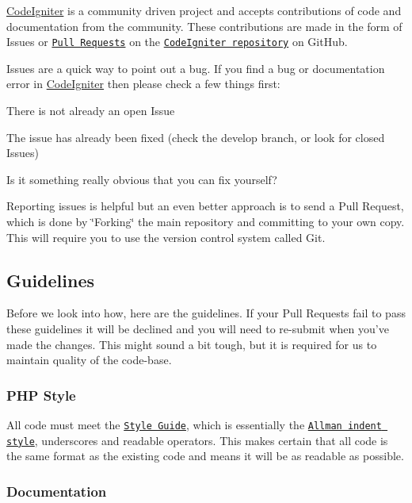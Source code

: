 \hyperlink{namespace_code_igniter}{Code\+Igniter} is a community driven project and accepts contributions of code and documentation from the community. These contributions are made in the form of Issues or \href{http://help.github.com/send-pull-requests/}{\tt Pull Requests} on the \href{https://github.com/bcit-ci/CodeIgniter}{\tt Code\+Igniter repository} on Git\+Hub.

Issues are a quick way to point out a bug. If you find a bug or documentation error in \hyperlink{namespace_code_igniter}{Code\+Igniter} then please check a few things first\+:


\begin{DoxyEnumerate}
\item There is not already an open Issue
\item The issue has already been fixed (check the develop branch, or look for closed Issues)
\item Is it something really obvious that you can fix yourself?
\end{DoxyEnumerate}

Reporting issues is helpful but an even better approach is to send a Pull Request, which is done by \char`\"{}\+Forking\char`\"{} the main repository and committing to your own copy. This will require you to use the version control system called Git.

\subsection*{Guidelines}

Before we look into how, here are the guidelines. If your Pull Requests fail to pass these guidelines it will be declined and you will need to re-\/submit when you’ve made the changes. This might sound a bit tough, but it is required for us to maintain quality of the code-\/base.

\subsubsection*{P\+H\+P Style}

All code must meet the \href{http://codeigniter.com/user_guide/general/styleguide.html}{\tt Style Guide}, which is essentially the \href{http://en.wikipedia.org/wiki/Indent_style#Allman_style}{\tt Allman indent style}, underscores and readable operators. This makes certain that all code is the same format as the existing code and means it will be as readable as possible.

\subsubsection*{Documentation}

